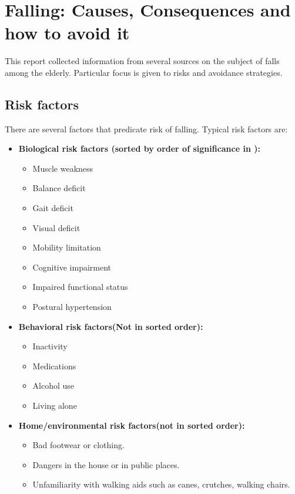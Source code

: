 \section{Falling: Causes, Consequences and how to avoid it}
This report collected information from several sources on the subject of falls among the elderly. Particular focus is given to risks and avoidance strategies.

\subsection{Risk factors}

There are several factors that predicate risk of falling. Typical risk factors are:
\begin{itemize}
\item 
\textbf{Biological risk factors (sorted by order of significance in  \cite{fallsRubenstein}):}
\begin{itemize}
\item Muscle weakness
\item Balance deficit
\item Gait deficit
\item Visual deficit
\item Mobility limitation
\item Cognitive impairment
\item Impaired functional status
\item Postural hypertension
\end{itemize}
\item 
\textbf{Behavioral risk factors(Not in sorted order):}
\begin{itemize}
\item Inactivity \cite{cdcComProg}
\item Medications \cite{cdcComProg}
\item Alcohol use \cite{cdcComProg}
\item Living alone \cite{housing}
\end{itemize}
\item 
\textbf{Home/environmental risk factors(not in sorted order): \cite{WHO}}
\begin{itemize}
\item Bad footwear or clothing.
\item Dangers in the house or in public places.
\item Unfamiliarity with walking aids such as canes, crutches, walking chairs.
\end{itemize}
\end{itemize}

